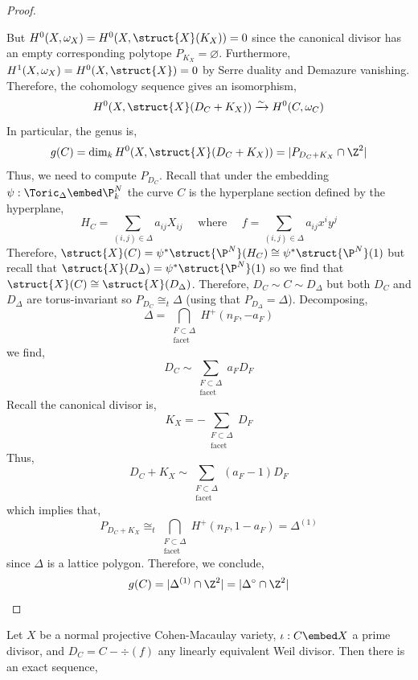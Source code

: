 \begin{proof}
\begin{center}
\begin{tikzcd}
\end{tikzcd}
\end{center} 
But $H^0(X, \omega_X) = H^0(X, \struct{X}(K_X)) = 0$ since the canonical divisor    has an empty corresponding polytope $P_{K_X} = \varnothing$. Furthermore, $H^1(X, \omega_X) = H^0(X, \struct{X}) = 0$ by Serre duality and Demazure vanishing. Therefore, the cohomology sequence gives an isomorphism,
\[ H^0(X, \struct{X}(D_C + K_X)) \xrightarrow{\sim} H^0(C, \omega_C) \]
In particular, the genus is,
\[ g(C) = \dim_k H^0(X, \struct{X}(D_C + K_X)) = | P_{D_C + K_X} \cap \Z^2 | \]
Thus, we need to compute $P_{D_C}$. Recall that under the embedding $\psi : \Toric_\Delta \embed \P^N_k$ the curve $C$ is the hyperplane section defined by the hyperplane,
\[ H_C = \sum_{(i, j) \in \Delta} a_{ij} X_{ij} \quad \text{ where } \quad f = \sum_{(i,j) \in \Delta} a_{ij} x^i y^j \]
Therefore, $\struct{X}(C) = \psi^* \struct{\P^N}(H_C) \cong \psi^* \struct{\P^N}(1)$ but recall that $\struct{X}(D_\Delta) = \psi^* \struct{\P^N}(1)$ so we find that $\struct{X}(C) \cong \struct{X}(D_\Delta)$. Therefore, $D_C \sim C \sim D_\Delta$ but both $D_C$ and $D_\Delta$ are torus-invariant so $P_{D_C} \cong_t \Delta$ (using that $P_{D_\Delta} = \Delta$). Decomposing,
\[ \Delta = \bigcap_{\substack{F \subset \Delta \\ \text{facet}}} H^+(n_F, - a_F) \]
we find,
\[ D_C \sim \sum_{\substack{F \subset \Delta \\ \text{facet}}} a_F D_F \]
Recall the canonical divisor is,
\[ K_X = - \sum_{\substack{F \subset \Delta \\ \text{facet}}} D_F \]
Thus,
\[ D_C + K_X \sim \sum_{\substack{F \subset \Delta \\ \text{facet}}} (a_F - 1) D_F \]
which implies that,
\[ P_{D_C + K_X} \cong_t \bigcap_{\substack{F \subset \Delta \\ \text{facet}}} H^+(n_F, 1 - a_F) = \Delta^{(1)} \]
since $\Delta$ is a lattice polygon. Therefore, we conclude,
\[ g(C) = | \Delta^{(1)} \cap \Z^2 | = | \Delta^\circ \cap \Z^2 | \]
\end{proof}

\begin{theorem} \label{adjunction}
Let $X$ be a normal projective Cohen-Macaulay variety, $\iota : C \embed X$ a prime divisor, and $D_C = C - \div{(f)}$ any linearly equivalent Weil divisor. Then there is an exact sequence,
\begin{center}
\end{center}
\end{theorem}

